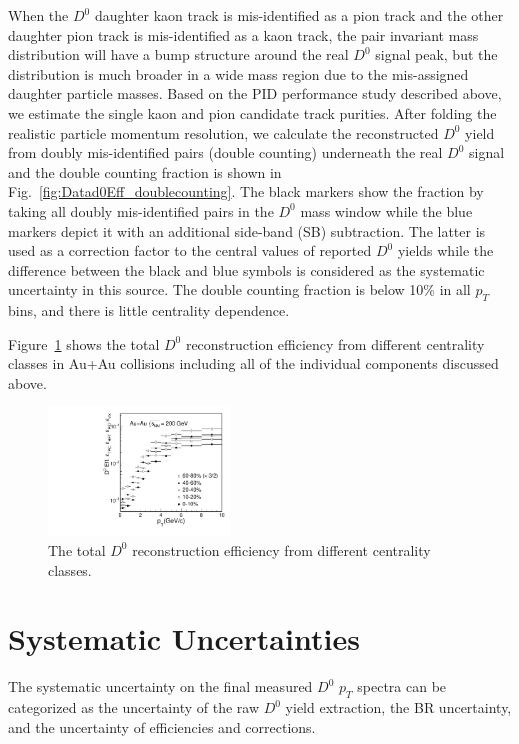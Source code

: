 \documentclass[%
 reprint,	
showpacs,
 amsmath,amssymb,
 aps,
 prc,
]{revtex4-1}
\begin{document}
When the $D^0$ daughter kaon track is mis-identified as a pion track and the other daughter pion track is mis-identified as a kaon track, the pair invariant mass distribution will have a bump structure around the real $D^0$ signal peak, but the distribution is much broader in a wide mass region due to the mis-assigned daughter particle masses. Based on the PID  performance study described above, we estimate the single kaon and pion candidate track purities. After folding the realistic particle momentum resolution, we calculate the reconstructed $D^0$ yield from doubly mis-identified pairs (double counting) underneath the real $D^0$ signal and the double counting fraction is shown in Fig.~\ref{fig:Datad0Eff_doublecounting}. The black markers show the fraction by taking all doubly mis-identified pairs in the $D^0$ mass window while the blue markers depict it with an additional side-band (SB) subtraction. The latter is used as a correction factor to the central values of reported $D^0$ yields while the difference between the black and blue symbols is considered as the systematic uncertainty in this source. The double counting fraction is below 10\% in all $p_{T}$ bins, and there is little centrality dependence.

Figure~\ref{fig:Datad0Eff} shows the total $D^{0}$ reconstruction efficiency from different centrality classes in Au+Au collisions including all of the individual components discussed above.

\begin{figure}
\centering
\includegraphics[width=0.43\textwidth]{fig/Datad0Eff_10.pdf}
\caption{The total $D^{0}$ reconstruction efficiency from different centrality classes.}
\label{fig:Datad0Eff} 
\end{figure}

\section{Systematic Uncertainties}
\label{systematic}

The systematic uncertainty on the final measured $D^0$ $p_{T}$ spectra can be categorized as the uncertainty of the raw $D^0$ yield extraction, the BR uncertainty, and the uncertainty of efficiencies and corrections.
\end{document}
